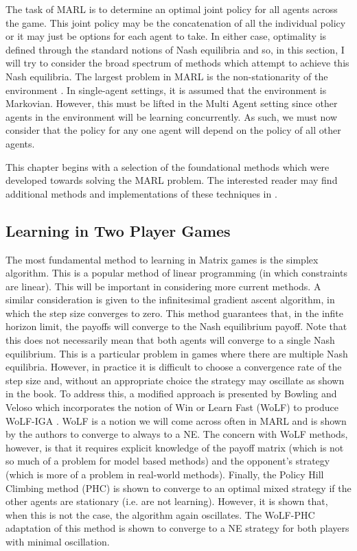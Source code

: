 \documentclass[.../main.tex]{subfiles}
\begin{document}
The task of MARL is to determine an optimal joint policy for all agents across the game. This joint
policy may be the concatenation of all the individual policy or it may just be options for each
agent to take. In either case, optimality is defined through the standard notions of Nash equilibria
and so, in this section, I will try to consider the broad spectrum of methods which attempt to
achieve this Nash equilibria. The largest problem in MARL is the non-stationarity of the environment
\cite{Hernandez-LealA}. In single-agent settings, it is assumed that the environment is Markovian.
However, this must be lifted in the Multi Agent setting since other agents in the environment will
be learning concurrently. As such, we must now consider that the policy for any one agent will
depend on the policy of all other agents. 

This chapter begins with a selection of the foundational methods which were developed towards
solving the MARL problem. The interested reader may find additional methods and implementations of
these techniques in \cite{SchwartzMulti-agentApproach}.

\subsection{Learning in Two Player Games} \label{sec::Two_Player_Games}

The most fundamental method to learning in Matrix games is the simplex algorithm. This is a popular
method of linear programming (in which constraints are linear). This will be important in
considering more current methods. A similar consideration is given to the infinitesimal gradient
ascent algorithm, in which the step size converges to zero. This method guarantees that, in the
infite horizon limit, the payoffs will converge to the Nash equilibrium payoff. Note that this does
not necessarily mean that both agents will converge to a single Nash equilibrium. This is a
particular problem in games where there are multiple Nash equilibria. However, in practice it is
difficult to choose a convergence rate of the step size and, without an appropriate choice the
strategy may oscillate as shown in the book. To address this, a modified approach is presented by
Bowling and Veloso which incorporates the notion of Win or Learn Fast (WoLF) to produce WoLF-IGA
\cite{Bowling2002}.
WoLF is a notion we will come across often in MARL and is shown by the authors to converge to always
to a NE. The concern with WoLF methods, however, is that it requires explicit knowledge of the
payoff matrix (which is not so much of a problem for model based methods) and the opponent's
strategy (which is more of a problem in real-world methods). Finally, the Policy Hill Climbing
method (PHC) is shown to converge to an optimal mixed strategy if the other agents are stationary
(i.e. are not learning). However, it is shown that, when this is not the case, the algorithm again
oscillates. The WoLF-PHC adaptation of this method is shown to converge to a NE strategy for both
players with minimal oscillation. 
\end{document}
